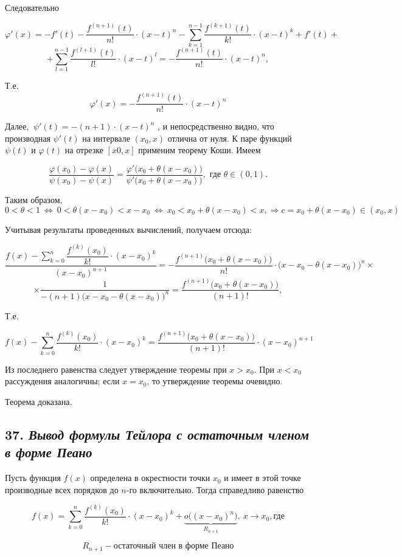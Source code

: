 Следовательно

$$
\varphi'(x) = -f'(t) -\dfrac{f^{(n+1)}(t)}{n!}
\cdot (x - t)^n - \sum\limits_{k=1}^{n-1} \dfrac{f^{(k+1)}(t) }{k!}\cdot (x - t)^k + f'(t) +
$$ $$
+ \sum\limits_{l=1}^{n-1} \dfrac{f^{(l+1)}(t) }{l!}\cdot (x - t)^l = -\dfrac{f^{(n+1)}(t)}{n!} \cdot (x - t)^n,
$$

Т.е. $$
\varphi'(x) =-\dfrac{f^{(n+1)}(t)}{n!} \cdot (x - t)^n
$$

Далее, $\ \psi'(t) = -(n + 1)\cdot (x - t)^n$ , и непосредственно видно, что производная $\psi'(t)$ на интервале $(x_0, x)$ отлична от нуля. К паре функций $\psi(t)$ и $\varphi(t)$ на отрезке $[x0, x]$ применим теорему Коши. Имеем

$$
\dfrac{\varphi(x_0) - \varphi(x)}{\psi(x_0) - \psi(x)} =\dfrac{\varphi'\big(x_0 + \theta(x - x_0)\big)}{\psi'\big(x_0+\theta(x - x_0)\big)} , \text{ где } \theta \in (0, 1).
$$

Таким образом, $0 < \theta<1 \ \iff \ 0 < \theta (x - x_0) < x - x_0 \ \iff \ x_0 < x_0 + \theta (x - x_0) < x, \Rightarrow c = x_0 + \theta (x - x_0) \in (x_0, x)$

Учитывая результаты проведенных вычислений, получаем отсюда:

$$
\dfrac{f(x) - \sum\limits_{k=0}^n{\dfrac{f^{(k)}(x_0)}{k!}}\cdot (x - x_0)^k}{(x - x_0)^{n + 1}} = - \dfrac{f^{(n + 1)}\big(x_0 + \theta(x - x_0)\big)}{n!}\cdot \big(x - x_0 - \theta(x - x_0)\big)^n\times
$$ $$
\times \dfrac{1}{-(n + 1)\big(x - x_0 - \theta(x - x_0)\big)^n} = \dfrac{f^{(n+1)}\big(x_0 + \theta(x - x_0)\big)}{(n+1)!},
$$

Т.е.

$$
f(x) - \sum\limits_{k=0}^n{\dfrac{f^{(k)}(x_0)}{k!}}\cdot (x - x_0)^k = {\dfrac{f^{(n+1)}\big(x_0 + \theta(x - x_0)\big)}{(n+1)!}}\cdot (x - x_0)^{n + 1}
$$

Из последнего равенства следует утверждение теоремы при $x > x_0$. При $x < x_0$ рассуждения аналогичны; если $x = x_0$, то утверждение теоремы очевидно.

Теорема доказана.
\newpage 
\subsection*{37. \textit{Вывод формулы Тейлора с остаточным членом в форме Пеано}}

Пусть функция $f(x)$ определена в окрестности точки $x_0$ и имеет в этой точке производные всех порядков до $n$-го включительно. Тогда справедливо равенство
\begin{mainQuote}

$$ f(x) = \sum\limits_{k=0}^n\dfrac{f^{(k)}(x_0)}{k!}\cdot (x - x_0)^k + \underbrace{o\big((x - x_0)^n\big)}_{R_{n+1}}, \ x \rightarrow x_0, \text{где} $$

$$ R_{n+1} - \text{остаточный член в форме Пеано}$$
\end{mainQuote}

